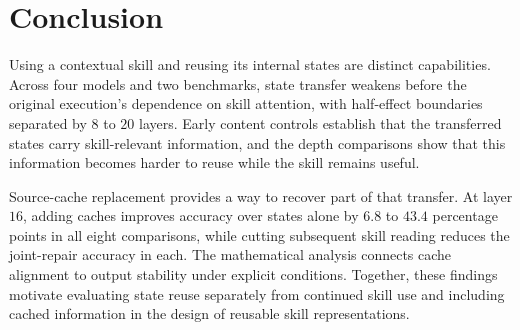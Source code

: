 \section{Conclusion}
\label{sec:conclusion}

Using a contextual skill and reusing its internal states are distinct
capabilities. Across four models and two benchmarks, state transfer
weakens before the original execution's dependence on skill attention,
with half-effect boundaries separated by $8$ to $20$ layers.
Early content controls establish that the transferred states carry
skill-relevant information, and the depth comparisons show that this
information becomes harder to reuse while the skill remains useful.

Source-cache replacement provides a way to recover part of that transfer.
At layer $16$, adding caches improves accuracy over states alone by
$6.8$ to $43.4$ percentage points in all eight comparisons, while cutting
subsequent skill reading reduces the joint-repair accuracy in each.
The mathematical analysis connects cache alignment to output stability
under explicit conditions. Together, these findings motivate evaluating
state reuse separately from continued skill use and including cached
information in the design of reusable skill representations.
